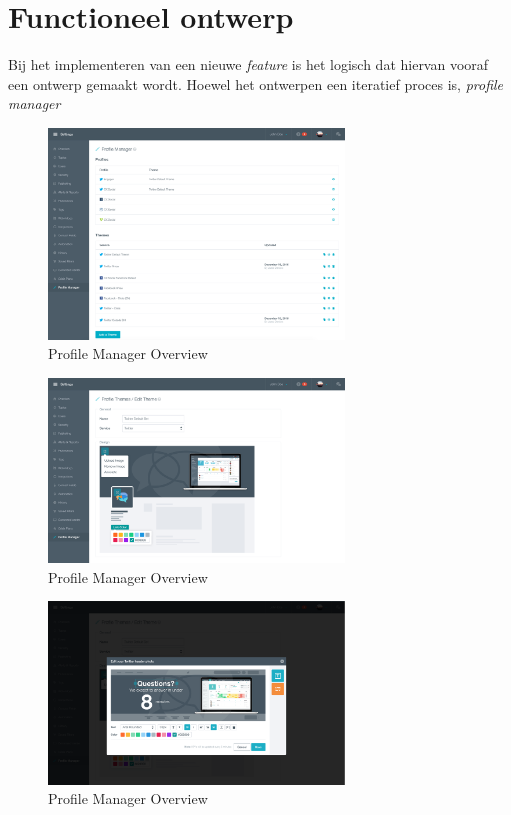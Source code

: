\iffalse
\newpage
\section{Functioneel ontwerp}
Bij het implementeren van een nieuwe \textit{feature} is het logisch dat hiervan vooraf een ontwerp gemaakt wordt. Hoewel het ontwerpen een iteratief proces is, 
\textit{profile manager} 


\begin{figure}[H]
	\centering
	\includegraphics[width=0.7\textwidth]{Figuren/Mockups/Overview.png}
	\caption{Profile Manager Overview}
\end{figure} 

\begin{figure}[H]
	\centering
	\includegraphics[width=0.7\textwidth]{Figuren/Mockups/AddTheme.png}
	\caption{Profile Manager Overview}
\end{figure} 

\begin{figure}[H]
	\centering
	\includegraphics[width=0.7\textwidth]{Figuren/Mockups/AnnotationsDialog.png}
	\caption{Profile Manager Overview}
\end{figure} 

